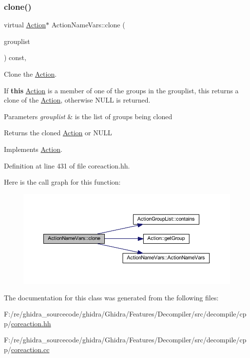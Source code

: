 \subsubsection{\texorpdfstring{clone()}{clone()}}
{\footnotesize\ttfamily virtual \mbox{\hyperlink{class_action}{Action}}$\ast$ Action\+Name\+Vars\+::clone (\begin{DoxyParamCaption}\item[{const \mbox{\hyperlink{class_action_group_list}{Action\+Group\+List}} \&}]{grouplist }\end{DoxyParamCaption}) const\hspace{0.3cm}{\ttfamily [inline]}, {\ttfamily [virtual]}}



Clone the \mbox{\hyperlink{class_action}{Action}}. 

If {\bfseries{this}} \mbox{\hyperlink{class_action}{Action}} is a member of one of the groups in the grouplist, this returns a clone of the \mbox{\hyperlink{class_action}{Action}}, otherwise N\+U\+LL is returned. 
\begin{DoxyParams}{Parameters}
{\em grouplist} & is the list of groups being cloned \\
\hline
\end{DoxyParams}
\begin{DoxyReturn}{Returns}
the cloned \mbox{\hyperlink{class_action}{Action}} or N\+U\+LL 
\end{DoxyReturn}


Implements \mbox{\hyperlink{class_action_af8242e41d09e5df52f97df9e65cc626f}{Action}}.



Definition at line 431 of file coreaction.\+hh.

Here is the call graph for this function\+:
\nopagebreak
\begin{figure}[H]
\begin{center}
\leavevmode
\includegraphics[width=350pt]{class_action_name_vars_a93b62205bd339268977f7ae15f665eef_cgraph}
\end{center}
\end{figure}


The documentation for this class was generated from the following files\+:\begin{DoxyCompactItemize}
\item 
F\+:/re/ghidra\+\_\+sourcecode/ghidra/\+Ghidra/\+Features/\+Decompiler/src/decompile/cpp/\mbox{\hyperlink{coreaction_8hh}{coreaction.\+hh}}\item 
F\+:/re/ghidra\+\_\+sourcecode/ghidra/\+Ghidra/\+Features/\+Decompiler/src/decompile/cpp/\mbox{\hyperlink{coreaction_8cc}{coreaction.\+cc}}\end{DoxyCompactItemize}
